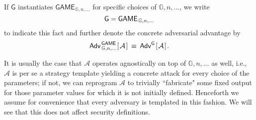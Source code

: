 \documentclass[psamsfonts, reqno]{amsart}
\theoremstyle{definition}
\theoremstyle{remark}
\numberwithin{equation}{section}
\begin{document}
\noindent
If $\mathsf{G}$ instantiates
$\mathsf{GAME}_{\hspace{1pt}\mathbb{G}, n, \dots}$
for specific choices of $\mathbb{G}, n, \dots$,
we write
\vspace{5pt}
\begin{equation*}
	\mathsf{G} = \mathsf{GAME}
		_{\hspace{1pt}\mathbb{G}, n, \dots}
\vspace{5pt}
\end{equation*}
to indicate this fact and
further denote the concrete adversarial advantage by
\vspace{5pt}
\begin{equation*}
	\mathsf{Adv}
		_{\hspace{1pt}\mathbb{G}, n, \dots}
		^{\hspace{1pt}\mathsf{GAME}}
		[
			\hspace{1pt}
			\mathcal{A}
			\hspace{1pt}
		]
	\hspace{2pt}
	\equiv
	\hspace{2pt}
	\mathsf{Adv}^{\hspace{0pt}\mathsf{G}}\hspace{1pt}[
		\hspace{1pt}
		\mathcal{A}
		\hspace{1pt}
	]\hspace{1pt}.
\vspace{5pt}
\end{equation*}

\noindent
It is usually the case that $\mathcal{A}$
operates agnostically on top of $\mathbb{G}, n, \dots$
as well, i.e., $\mathcal{A}$ is per se a strategy template
yielding a concrete attack
for every choice of the parameters;
if not, we can reprogram $\mathcal{A}$
to trivially ``fabricate" some fixed output for those
parameter values for which it is not initially defined.
Henceforth we assume for convenience
that every adversary
is templated in this fashion.
We will see that this does not affect
security definitions.
\end{document}
